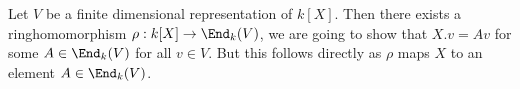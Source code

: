 
Let $V$ be a finite dimensional representation of $k[X]$. Then there exists a ringhomomorphism $\rho: k[X] \to \End_k(V)$, we are going to show that $X.v = Av$ for some $A \in \End_k(V)$ for all $v\in V$. But this follows directly as $\rho$ maps $X$ to an element $A\in \End_k(V)$. 